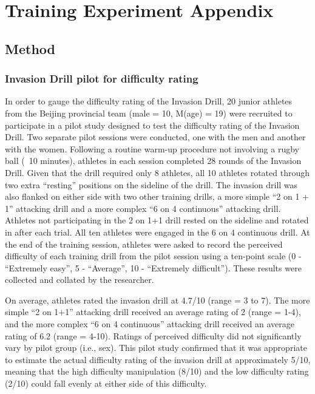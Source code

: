 \chapter{\label{app6:trainingExperiment}Training Experiment Appendix}

\section{\label{app6:method}Method}

\subsection{\label{app6:difficultyPilot}Invasion Drill pilot for difficulty rating}
In order to gauge the difficulty rating of the Invasion Drill, 20 junior athletes from the Beijing provincial team (male = 10,  M(age) = 19) were recruited to participate in a pilot study designed to test the difficulty rating of the Invasion Drill. Two separate pilot sessions were conducted, one with the men and another with the women. Following a routine warm-up procedure not involving a rugby ball (~10 minutes), athletes in each session completed 28 rounds of the Invasion Drill.  Given that the drill required only 8 athletes, all 10 athletes rotated through two extra ``resting'' positions on the sideline of the drill.  The invasion drill was also flanked on either side with two other  training drills, a more simple ``2 on 1 + 1'' attacking drill and a more complex ``6 on 4 continuous'' attacking drill.  Athletes not participating in the 2 on 1+1 drill rested on the sideline and rotated in after each trial.  All ten athletes were engaged in the 6 on 4 continuous drill. At the end of the training session, athletes were asked to record the perceived difficulty of each training drill from the pilot session using a ten-point scale (0 - ``Extremely easy'', 5 - ``Average'', 10 - ``Extremely difficult''). These results were collected and collated by the researcher.

On average, athletes rated the invasion drill at 4.7/10 (range = 3 to 7).  The more simple ``2 on 1+1'' attacking drill received an average rating of 2 (range = 1-4), and the more complex ``6 on 4 continuous'' attacking drill received an average rating of 6.2 (range = 4-10). Ratings of perceived difficulty did not significantly vary by pilot group (i.e., sex). This pilot study confirmed that it was appropriate to estimate the actual difficulty rating of the invasion drill at approximately 5/10, meaning that the high difficulty manipulation (8/10) and the low difficulty rating (2/10) could fall evenly at either side of this difficulty.


